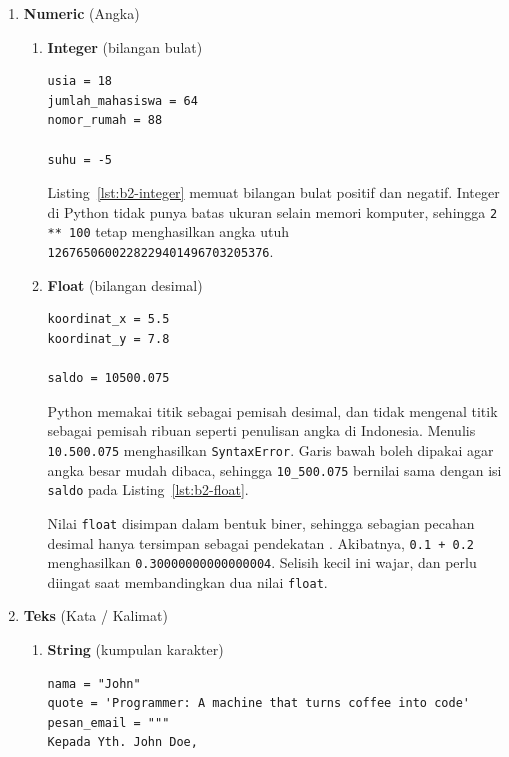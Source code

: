 \begin{enumerate}
\item \textbf{Numeric} (Angka)
\begin{enumerate}
\item \textbf{Integer} (bilangan bulat)
\begin{lstlisting}[style=PythonStyle, caption={Contoh nilai integer}, label={lst:b2-integer}]
usia = 18
jumlah_mahasiswa = 64
nomor_rumah = 88

suhu = -5
\end{lstlisting}

Listing~\ref{lst:b2-integer} memuat bilangan bulat positif dan negatif. Integer di Python tidak punya batas ukuran selain memori komputer, sehingga \texttt{2 ** 100} tetap menghasilkan angka utuh \texttt{1267650600228229401496703205376}.

\item \textbf{Float} (bilangan desimal)
\begin{lstlisting}[style=PythonStyle, caption={Contoh nilai float}, label={lst:b2-float}]
koordinat_x = 5.5
koordinat_y = 7.8

saldo = 10500.075
\end{lstlisting}

Python memakai titik sebagai pemisah desimal, dan tidak mengenal titik sebagai pemisah ribuan seperti penulisan angka di Indonesia. Menulis \texttt{10.500.075} menghasilkan \texttt{SyntaxError}. Garis bawah boleh dipakai agar angka besar mudah dibaca, sehingga \texttt{10_500.075} bernilai sama dengan isi \texttt{saldo} pada Listing~\ref{lst:b2-float}.

Nilai \texttt{float} disimpan dalam bentuk biner, sehingga sebagian pecahan desimal hanya tersimpan sebagai pendekatan \cite{py-tut-floatingpoint}. Akibatnya, \texttt{0.1 + 0.2} menghasilkan \texttt{0.30000000000000004}. Selisih kecil ini wajar, dan perlu diingat saat membandingkan dua nilai \texttt{float}.
\end{enumerate}

\item \textbf{Teks} (Kata / Kalimat)
\begin{enumerate}
\item \textbf{String} (kumpulan karakter)
\begin{lstlisting}[style=PythonStyle, caption={Contoh nilai string}, label={lst:b2-string}]
nama = "John"
quote = 'Programmer: A machine that turns coffee into code'
pesan_email = """
Kepada Yth. John Doe,


\end{lstlisting}
\end{enumerate}
\end{enumerate}
